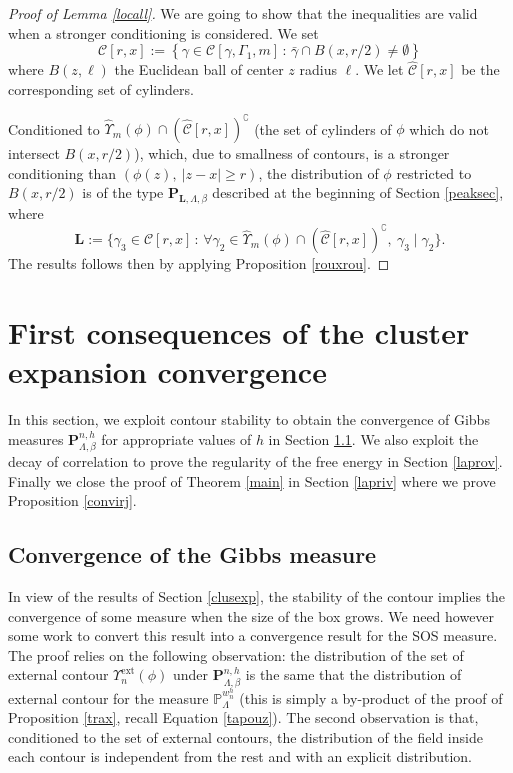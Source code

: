 \documentclass[10pt]{amsart}
\let\mathcal\mathscr
\newcommand{\sep}{\,:\,}
\numberwithin{equation}{section}
\theoremstyle{plain}
\theoremstyle{definition}
\newcommand{\ext}{\mathrm{ext}}
\newcommand{\cc}{\complement}
\newcommand{\cC}{{\ensuremath{\mathcal C}} }
\newcommand{\bP}{{\ensuremath{\mathbf P}} }
\newcommand{\bL}{{\ensuremath{\mathbf L}} }
\newcommand{\bbP}{{\ensuremath{\mathbb P}} }
\newcommand{\gb}{\beta}
\newcommand{\gG}{\Gamma}
\newcommand{\gL}{\Lambda}
\begin{document}
\begin{proof}[Proof of Lemma \ref{locall}]
We are going to show that the inequalities are valid when a stronger conditioning is considered.
We set\vspace*{-3pt}
\[
\cC[r,x]:=\left\{ \gamma \in \cC[\gamma,\gG_1,m] \sep \bar \gamma\cap B(x,r/2)\ne \emptyset \right\}
\]
where $B(z,\ell)$
the Euclidean ball of center $z$ radius $\ell$. We let $\hat \cC[r,x]$ be the corresponding set of cylinders.

Conditioned to $\hat\Upsilon_{m}(\phi)\cap (\hat \cC[r,x])^{\cc}$ (the set of cylinders of $\phi$ which do not intersect $B(x,r/2)$), which, due to smallness of contours,
is a stronger conditioning than
$(\phi(z),\ |z-x|\ge r)$,
the distribution of
$\phi$ restricted to $B(x,r/2)$
is of the type $\bP_{\bL,\gL,\gb}$ described at the beginning of Section \ref{peaksec}, where
\[
\bL:=\{\gamma_3 \in \cC[r,x] \sep \forall \gamma_2\in \hat\Upsilon_{m}(\phi)\cap (\hat \cC[r,x])^{\cc},\ \gamma_3 \mid \gamma_2 \}.
\]
The results follows then by applying Proposition \ref{rouxrou}.
\end{proof}

\section{First consequences of the cluster expansion convergence}\label{dalast}

In this section, we exploit contour stability to obtain
the convergence of Gibbs measures $\bP^{n,h}_{\gL,\gb}$ for appropriate values of $h$ in Section \ref{moots}.
We also exploit the decay of correlation to prove the regularity of the free energy in Section \ref{laprov}.
Finally we close the proof of Theorem \ref{main} in Section \ref{lapriv} where we prove Proposition \ref{convirj}.

\subsection{Convergence of the Gibbs measure}\label{moots}

In view of the results of Section \ref{clusexp}, the stability of the contour implies the convergence of some measure when the size of the box grows.
We need however some work to convert this result into a convergence result for the SOS measure.
The proof relies on the following observation: the distribution of the set of external contour $\Upsilon^{\ext}_n(\phi)$
under $\bP^{n,h}_{\gL,\gb}$ is the same that the distribution of external contour for the measure $\bbP^{w^{h}_{n}}_{\gL}$
(this is simply a by-product of the proof of Proposition \ref{trax}, recall Equation \eqref{tapouz}).
The second observation is that, conditioned to the set of external contours, the distribution of the field inside each contour is independent from the
rest and with an explicit distribution.
\end{document}

